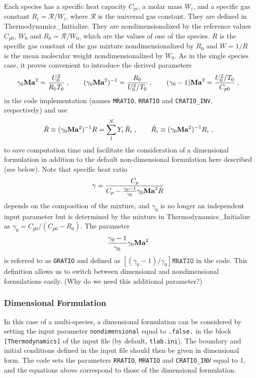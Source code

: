 Each species has a specific heat capacity $C_{pi}$, a molar mass $W_i$, and a specific gas constant $R_i=\mathcal{R}/W_i$, where  $\mathcal{R}$ is the universal gas constant. They are defined in {Thermodynamics\_Initialize}. They are nondimensionalized by the reference values $C_{p0}$, $W_0$ and $R_0=\mathcal{R}/W_0$, which are the values of one of the species. $R$ is the specific gas constant of the gas mixture nondimensionalized by $R_0$ and $W=1/R$ is the mean molecular weight nondimensionalized by $W_0$. As in the single species case, it proves convenient to introduce the derived parameters
\begin{equation}
    \gamma_0\mathrm{\bf Ma}^2=\frac{U_0^2}{R_0T_0}\;,\qquad (\gamma_0\mathrm{\bf Ma}^2)^{-1}=\frac{R_0}{U^2_0/T_0}\;,\qquad (\gamma_0-1)\mathrm{\bf Ma}^2 =\frac{U_0^2/T_0}{C_{p0}} \;,
\end{equation}
in the code implementation (names \texttt{MRATIO}, \texttt{RRATIO} and \texttt{CRATIO\_INV}, respectively) and use 
\begin{equation}
    \tilde{R}\equiv (\gamma_0\mathrm{\bf Ma}^2)^{-1}R=\sum_1^NY_i\,\tilde{R}_i\;,\qquad\tilde{R}_i\equiv (\gamma_0\mathrm{\bf Ma}^2)^{-1}R_i
    \;,
\end{equation}
to save computation time and facilitate the consideration of a dimensional formulation in addition to the default non-dimensional formulation here described (see below). Note that specific heat ratio
\begin{equation}
    \gamma=\frac{C_p}{C_p-\frac{\gamma_0-1}{\gamma_0}\gamma_0\mathrm{\bf Ma}^2\tilde{R}}
\end{equation}
depends on the composition of the mixture, and $\gamma_0$ is no longer an independent input parameter but is determined by the mixture in {Thermodynamics\_Initialize} as $\gamma_0=C_{p0}/(C_{p0}-R_0)$. The parameter
\begin{equation}
    \frac{\gamma_0-1}{\gamma_0}\gamma_0\mathrm{\bf Ma}^2
\end{equation}
is referred to as \texttt{GRATIO} and defined as $[(\gamma_0-1)/\gamma_0]\texttt{MRATIO}$ in the code. This definition allows us to switch between dimensional and nondimensional formulations easily. (Why do we need this additional parameter?)


\subsubsection{Dimensional Formulation}

In this case of a multi-species, a dimensional formulation can be considered by setting the input parameter \texttt{nondimensional} equal to \texttt{.false.} in the block \texttt{[Thermodynamics]} of the input file (by default, \texttt{tlab.ini}). The boundary and initial conditions defined in the input file should then be given in dimensional form. The code sets the parameters \texttt{RRATIO}, \texttt{MRATIO} and \texttt{CRATIO\_INV} equal to 1, and the equations above correspond to those of the dimensional formulation. %


